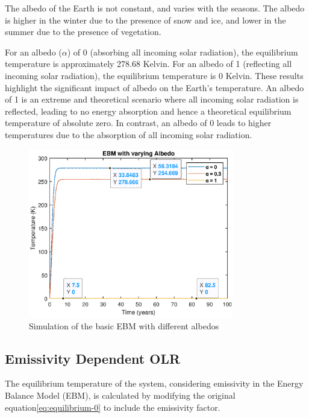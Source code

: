 \documentclass[12pt]{article}
\begin{document}

The albedo of the Earth is not constant, and varies with the seasons. The albedo is higher in the winter due to the presence of snow and ice, and lower in the summer due to the presence of vegetation\cite{kaper-2013-math-ac-albedo}. 

For an albedo ($\alpha$) of 0 (absorbing all incoming solar radiation), the equilibrium temperature is approximately 278.68 Kelvin. For an albedo of 1 (reflecting all incoming solar radiation), the equilibrium temperature is 0 Kelvin. These results highlight the significant impact of albedo on the Earth's temperature. An albedo of 1 is an extreme and theoretical scenario where all incoming solar radiation is reflected, leading to no energy absorption and hence a theoretical equilibrium temperature of absolute zero. In contrast, an albedo of 0 leads to higher temperatures due to the absorption of all incoming solar radiation.

\begin{figure}[!hbt]
    \centering
    \includegraphics[width=0.8\textwidth]{images/albedo_extremes.eps}
    \caption{Simulation of the basic EBM with different albedos}
    \label{fig:albedo_extremes}
\end{figure}

\subsection{Emissivity Dependent OLR}
The equilibrium temperature of the system, considering emissivity in the Energy Balance Model (EBM), is calculated by modifying the original equation\ref{eq:equilibrium-0} to include the emissivity factor\cite{kaper-2013-math-ac-emissivity}.
\end{document}
